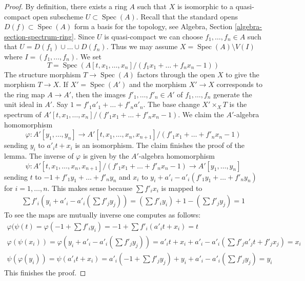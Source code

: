 \documentclass[10pt,a4paper]{amsart}
\theoremstyle{plain}
\theoremstyle{definition}
\theoremstyle{remark}
\numberwithin{equation}{subsection}
\def\Spec{\mathop{\mathrm{Spec}}}
\begin{document}
\begin{proof}
By definition, there exists a ring $A$ such that $X$ is isomorphic to a
quasi-compact open subscheme $U \subset \Spec(A)$. Recall that the standard
opens $D(f) \subset \Spec(A)$ form a basis for the topology, see
Algebra, Section \ref{algebra-section-spectrum-ring}. Since $U$ is
quasi-compact we can choose $f_1, \ldots, f_n \in A$ such that
$U = D(f_1) \cup \ldots \cup D(f_n)$. Thus we may assume
$X = \Spec(A) \setminus V(I)$ where $I = (f_1, \ldots, f_n)$. We set
$$
T = \Spec(A[t, x_1, \ldots, x_n]/(f_1 x_1 + \ldots + f_n x_n - 1))
$$
The structure morphism $T \to \Spec(A)$ factors through the open $X$
to give the morphism $T \to X$. If $X' = \Spec(A')$ and the morphism
$X' \to X$ corresponds to the ring map $A \to A'$, then the images
$f'_1, \ldots, f'_n \in A'$ of $f_1, \ldots, f_n$
generate the unit ideal in $A'$.
Say $1 = f'_1 a'_1 + \ldots + f'_n a'_n$.
The base change $X' \times_X T$ is the spectrum of
$A'[t, x_1, \ldots, x_n]/(f'_1 x_1 + \ldots + f'_n x_n - 1)$.
We claim the $A'$-algebra homomorphism
$$
\varphi :
A'[y_1, \ldots, y_n]
\longrightarrow
A'[t, x_1, \ldots, x_n, x_{n + 1}]/(f'_1 x_1 + \ldots + f'_n x_n - 1)
$$
sending $y_i$ to $a'_i t + x_i$ is an isomorphism. The claim finishes
the proof of the lemma. The inverse of $\varphi$ is given by the $A'$-algebra
homomorphism
$$
\psi :
A'[t, x_1, \ldots, x_n, x_{n + 1}]/(f'_1 x_1 + \ldots + f'_n x_n - 1)
\longrightarrow
A'[y_1, \ldots, y_n]
$$
sending $t$ to $-1 + f'_1 y_1 + \ldots + f'_n y_n$ and $x_i$ to
$y_i + a'_i - a'_i(f'_1 y_1 + \ldots + f'_n y_n)$ for $i = 1, \ldots, n$.
This makes sense because $\sum f'_ix_i$ is mapped to
$$
\begin{matrix}
\sum f'_i(y_i + a'_i - a'_i(\sum f'_j y_j)) =
(\sum f'_iy_i) + 1 - (\sum f'_j y_j) = 1
\end{matrix}
$$
To see the maps are mutually inverse one computes as follows:
$$
\begin{matrix}
\varphi(\psi(t) = \varphi(-1 +  \sum f'_i y_i) =
-1 + \sum f'_i (a'_i t + x_i) = t \\
\varphi(\psi(x_i)) = \varphi(y_i + a'_i - a'_i(\sum f'_j y_j)) =
a'_i t + x_i + a'_i - a'_i(\sum f'_ja'_jt + f'_jx_j) = x_i \\
\psi(\varphi(y_i)) = \psi(a'_i t + x_i) =
a'_i(-1 + \sum f'_j y_j) + y_i + a'_i - a'_i(\sum f'_j y_j) = y_i
\end{matrix}
$$
This finishes the proof.
\end{proof}
\end{document}
